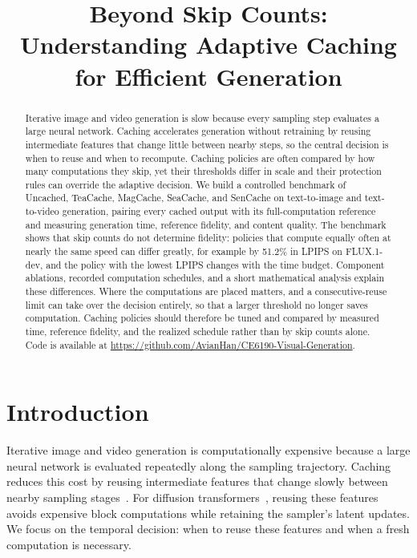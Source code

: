 \documentclass[10pt,twocolumn,letterpaper]{article}
\title{Beyond Skip Counts:\\Understanding Adaptive Caching for Efficient Generation}
\begin{document}
\maketitle
\equalfootnote %

\begin{abstract}
Iterative image and video generation is slow because every sampling step evaluates a large neural network.
Caching accelerates generation without retraining by reusing intermediate features that change little between nearby steps, so the central decision is when to reuse and when to recompute.
Caching policies are often compared by how many computations they skip, yet their thresholds differ in scale and their protection rules can override the adaptive decision.
We build a controlled benchmark of Uncached, TeaCache, MagCache, SeaCache, and SenCache on text-to-image and text-to-video generation, pairing every cached output with its full-computation reference and measuring generation time, reference fidelity, and content quality.
The benchmark shows that skip counts do not determine fidelity: policies that compute equally often at nearly the same speed can differ greatly, for example by 51.2\% in LPIPS on \mbox{FLUX.1-dev}, and the policy with the lowest LPIPS changes with the time budget.
Component ablations, recorded computation schedules, and a short mathematical analysis explain these differences.
Where the computations are placed matters, and a consecutive-reuse limit can take over the decision entirely, so that a larger threshold no longer saves computation.
Caching policies should therefore be tuned and compared by measured time, reference fidelity, and the realized schedule rather than by skip counts alone.
Code is available at \url{https://github.com/AvianHan/CE6190-Visual-Generation}.
\end{abstract}

\section{Introduction}
\label{sec:intro}
Iterative image and video generation is computationally expensive because a large neural network is evaluated repeatedly along the sampling trajectory.
Caching reduces this cost by reusing intermediate features that change slowly between nearby sampling stages~\cite{ma2024deepcache,liu2025teacache,kahatapitiya2025adacache}.
For diffusion transformers~\cite{peebles2023dit}, reusing these features avoids expensive block computations while retaining the sampler's latent updates.
We focus on the temporal decision: when to reuse these features and when a fresh computation is necessary.
\end{document}

